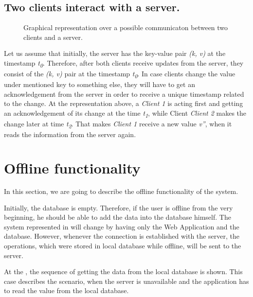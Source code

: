 \subsection{Two clients interact with a server.}

\begin{figure}[!htb]
    \begin{center}
    \def\svgwidth{\linewidth}
    
    \caption {Graphical representation over a possible communicaton between two clients and a server.}
    \label{fig:design4}
\end{center}
\end{figure}

Let us assume that initially, the server has the key-value pair \textit{(k, v)} at the timestamp \textit{t\textsubscript{0}}. Therefore, after both clients receive updates from the server, they consist of the \textit{(k, v)} pair at the timestamp \textit{t\textsubscript{0}}. In case clients change the value under mentioned key to something else, they will have to get an acknowledgement from the server in order to receive a unique timestamp related to the change. At the representation above, a \textit{Client 1} is acting first and getting an acknowledgement of its change at the time \textit{t\textsubscript{1}}, while Client \textit{Client 2} makes the change later at time \textit{t\textsubscript{2}}. That makes \textit{Client 1} receive a new value \textit{v''}, when it reads the information from the server again.

\section{Offline functionality}

In this section, we are going to describe the offline functionality of the system.

Initially, the database is empty. Therefore, if the user is offline from the very beginning, he should be able to add the data into the database himself. 
The system represented in  will change by having only the Web Application and the database. However, whenever the connection is established with the server, the operations, which were stored in local database while offline, will be sent to the server. 

At the , the sequence of getting the data from the local database is shown. This case describes the scenario, when the server is unavailable and the application has to read the value from the local database. 

